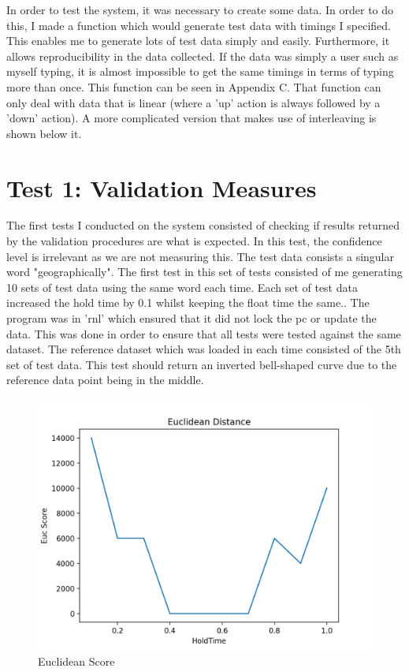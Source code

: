 \documentclass[10pt,a4paper]{report}
\begin{document}
In order to test the system, it was necessary to create some data. In order to do this, I made a function which would generate test data with timings I specified. This enables me to generate lots of test data simply and easily. Furthermore, it allows reproducibility in the data collected. If the data was simply a user such as myself typing, it is almost impossible to get the same timings in terms of typing more than once. This function can be seen in Appendix C. That function can only deal with data that is linear (where a 'up' action is always followed by a 'down' action). A more complicated version that makes use of interleaving is shown below it.


\section{Test 1: Validation Measures}

The first tests I conducted on the system consisted of checking if results returned by the validation procedures are what is expected. In this test, the confidence level is irrelevant as we are not measuring this. The test data consists a singular word "geographically". The first test in this set of tests consisted of me generating 10 sets of test data using the same word each time. Each set of test data increased the hold time by 0.1 whilst keeping the float time the same.. The program was in 'rnl' which ensured that it did not lock the pc or update the data. This was done in order to ensure that all tests were tested against the same dataset. The reference dataset which was loaded in each time consisted of the 5th set of test data. This test should return an inverted bell-shaped curve due to the reference data point being in the middle. 

\begin{figure}
	\centering
	\includegraphics[scale=0.6]{EUCGraph}
	\caption{Euclidean Score}
	\label{fig:EucGraph}
\end{figure}
\end{document}
